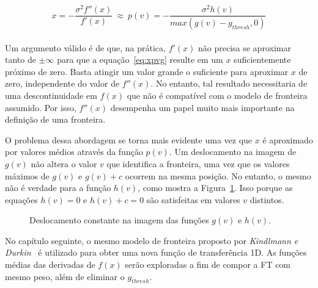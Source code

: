 \begin{equation} \label{eq:xpvg}
	x = -\frac{\sigma^{2}f''(x)}{f'(x)} \ \approx \ 
	p(v) = -\frac{\sigma^{2}h(v)}{max(g(v) - g_{thresh}, 0)}
\end{equation} \\

	Um argumento válido é de que, na prática, $ f'(x) $ não precisa se aproximar tanto de $ \pm \infty $ para que a equação~\eqref{eq:xpvg} resulte em um $ x $ suficientemente próximo de zero. Basta atingir um valor grande o suficiente para aproximar $ x $ de zero, independente do valor de $ f''(x) $. No entanto, tal resultado necessitaria de uma descontinuidade em $ f(x) $ que não é compatível com o modelo de fronteira assumido. Por isso, $ f''(x) $ desempenha um papel muito mais importante na definição de uma fronteira.
	
	O problema dessa abordagem se torna mais evidente uma vez que $ x $ é aproximado por valores médios através da função $ p(v) $. Um deslocamento na imagem de $ g(v) $ não altera o valor $ v $ que identifica a fronteira, uma vez que os valores máximos de $ g(v) $ e $ g(v) + c $ ocorrem na mesma posição. No entanto, o mesmo não é verdade para a função $ h(v) $, como mostra a Figura~\ref{fig:g_shift}. Isso porque as equações $ h(v) = 0 $ e $ h(v) + c = 0 $ são satisfeitas em valores $ v $ distintos.
	
\begin{figure}[h]
	\centering
	\caption{Deslocamento constante na imagem das funções $ g(v) $ e $ h(v) $.}
	\label{fig:g_shift}
\end{figure}

	No capítulo seguinte, o mesmo modelo de fronteira proposto por \textit{Kindlmann e Durkin}~\cite{gordon} é utilizado para obter uma nova função de transferência 1D. As funções médias das derivadas de $ f(x) $ serão exploradas a fim de compor a FT com mesmo peso, além de eliminar o $ g_{thresh} $.
